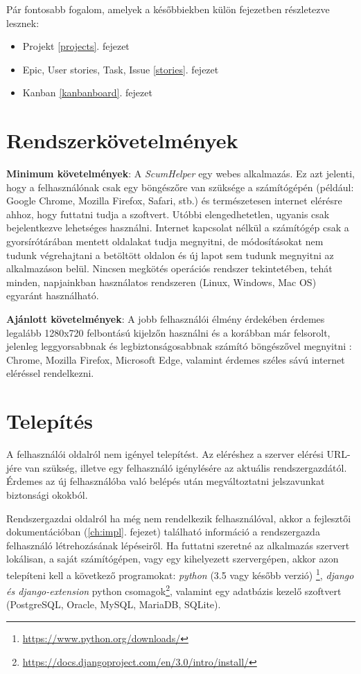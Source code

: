 Pár fontosabb fogalom, amelyek a későbbiekben külön fejezetben részletezve lesznek:
\begin{itemize}
	\item Projekt \ref{projects}. fejezet
	\item Epic, User stories, Task, Issue \ref{stories}. fejezet
	\item Kanban \ref{kanbanboard}. fejezet
\end{itemize}

\section{Rendszerkövetelmények} %

\textbf{Minimum követelmények}: A \textit{ScumHelper} egy webes alkalmazás. Ez azt jelenti, hogy a felhasználónak csak egy böngészőre van szüksége a számítógépén (például: Google Chrome, Mozilla Firefox, Safari, stb.) és természetesen internet elérésre ahhoz, hogy futtatni tudja a szoftvert. Utóbbi elengedhetetlen, ugyanis csak bejelentkezve lehetséges használni. Internet kapcsolat nélkül a számítógép csak a gyorsírótárában mentett oldalakat tudja megnyitni, de módosításokat nem tudunk végrehajtani a betöltött oldalon és új lapot sem tudunk megnyitni az alkalmazáson belül. Nincsen megkötés operációs rendszer tekintetében, tehát minden, napjainkban használatos rendszeren (Linux, Windows, Mac OS) egyaránt használható. 

\textbf{Ajánlott követelmények}: A jobb felhasználói élmény érdekében érdemes legalább 1280x720 felbontású kijelzőn használni és a korábban már felsorolt, jelenleg leggyorsabbnak és legbiztonságosabbnak számító böngészővel megnyitni : Chrome, Mozilla Firefox, Microsoft Edge, valamint érdemes széles sávú internet eléréssel rendelkezni.

\section{Telepítés}
\label{install}

A felhasználói oldalról nem igényel telepítést. Az eléréshez a szerver elérési URL-jére van szükség, illetve egy felhasználó igénylésére az aktuális rendszergazdától. Érdemes az új felhasználóba való belépés után megváltoztatni jelszavunkat biztonsági okokból.

Rendszergazdai oldalról ha még nem rendelkezik felhasználóval, akkor a fejlesztői dokumentációban (\ref{ch:impl}. fejezet) található információ a rendszergazda felhasználó létrehozásának lépéseiről.  Ha futtatni szeretné az alkalmazás szervert lokálisan, a saját számítógépen, vagy egy kihelyezett szervergépen, akkor azon telepíteni kell a következő programokat:  \textit{python} (3.5 vagy később verzió) \footnote{\url{https://www.python.org/downloads/}}, \textit{django és django-extension} python csomagok\footnote{\url{https://docs.djangoproject.com/en/3.0/intro/install/}}, valamint egy adatbázis kezelő szoftvert (PostgreSQL, Oracle, MySQL, MariaDB, SQLite).

